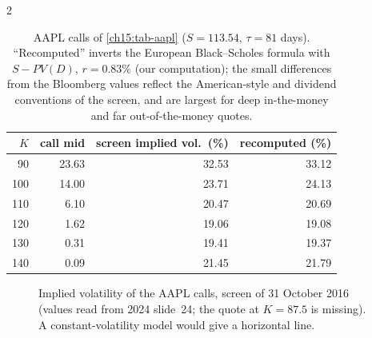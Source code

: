 \begin{paracol}{2}
\begin{table}[ht]
\centering\small
\begin{tabular}{r r r r}
\toprule
$K$ & call mid & screen implied vol.\ (\%) & recomputed (\%)\\
\midrule
90 & 23.63 & 32.53 & 33.12\\
100 & 14.00 & 23.71 & 24.13\\
110 & 6.10 & 20.47 & 20.69\\
120 & 1.62 & 19.06 & 19.08\\
130 & 0.31 & 19.41 & 19.37\\
140 & 0.09 & 21.45 & 21.79\\
\bottomrule
\end{tabular}
\caption{AAPL calls of \cref{ch15:tab-aapl} ($S=113.54$, $\tau=81$ days). ``Recomputed'' inverts the European Black--Scholes formula with $S-PV(D)$, $r=0.83\%$ (our computation); the small differences from the Bloomberg values reflect the
American-style and dividend conventions of the screen, and are largest for deep in-the-money and far out-of-the-money quotes.}\label{ch15:tab-smile}
\end{table}

\begin{figure}[ht]
\centering
{}
\caption{Implied volatility of the AAPL calls, screen of 31 October 2016 (values read from 2024 slide~24; the quote at $K=87.5$ is missing). A constant-volatility model would give a horizontal line.}\label{ch15:fig-smile}
\end{figure}


\end{paracol}
